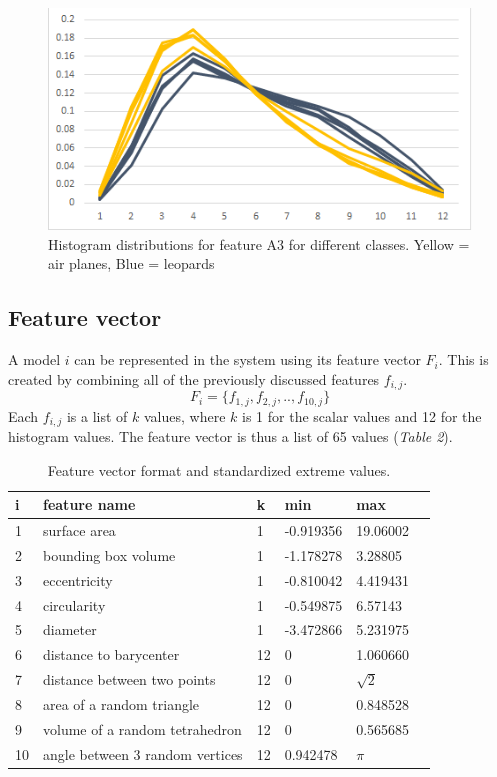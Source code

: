 \documentclass{bigdata}
\begin{document}
\begin{figure}[h!]
	\begin{center}
    \includegraphics[width=0.7\linewidth]{Pictures/Part3/A3.png}
    \caption{Histogram distributions for feature A3 for different classes. Yellow = air planes, Blue = leopards}
  \label{fig:eccentricity}
\end{center}
\end{figure}

\subsection{Feature vector}
A model $i$ can be represented in the system using its feature vector $F_i$. This is created by combining all of the previously discussed features $f_{i,j}$.
\begin{equation}
F_i = \{f_{1,j}, f_{2,j}, .. , f_{10,j}\}
\end{equation}
Each $f_{i,j}$ is a list of $k$ values, where $k$ is 1 for the scalar values and 12 for the histogram values. The feature vector is thus a list of 65 values (\textit{Table 2}).

\begin{table}[h!]
\begin{center}
\begin{tabular}
{ l | l | l | l | l | l}
i & feature name & k & min & max\\ \hline
1 & surface area & 1 & -0.919356 & 19.06002 \\
2 & bounding box volume & 1 & -1.178278 & 3.28805\\
3 & eccentricity & 1 & -0.810042 & 4.419431\\
4 & circularity & 1 & -0.549875 & 6.57143\\
5 & diameter & 1 & -3.472866 & 5.231975\\
6 & distance to barycenter & 12 & 0 & 1.060660\\
7 & distance between two points & 12 & 0 & $\sqrt{2}$\\
8 & area of a random triangle & 12 & 0 & 0.848528 \\
9 & volume of a random tetrahedron & 12 & 0 & 0.565685\\
10 & angle between 3 random vertices & 12 & 0.942478 & $\pi$\\
\end{tabular}
\end{center}
\caption{Feature vector format and standardized extreme values.}
\label{Table 2, }
\end{table}
\newpage
\end{document}

